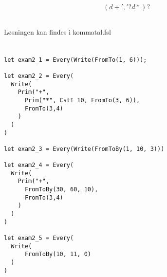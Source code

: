 \documentclass[11pt,a4paper]{article}
\begin{document}
\subsection{}
\begin{align}
    (d+','?d*)?
\end{align}
\subsection{}
Løsningen kan findes i kommatal.fsl
\section{}
\begin{verbatim}
let exam2_1 = Every(Write(FromTo(1, 6)));

let exam2_2 = Every(
  Write(
    Prim("+", 
      Prim("*", CstI 10, FromTo(3, 6)),
      FromTo(3,4)
    )
  )
)

let exam2_3 = Every(Write(FromToBy(1, 10, 3)))

let exam2_4 = Every(
  Write(
    Prim("+", 
      FromToBy(30, 60, 10),
      FromTo(3,4)
    )
  )
)

let exam2_5 = Every(
  Write(
      FromToBy(10, 11, 0)
  )
)
\end{verbatim}
\end{document}
